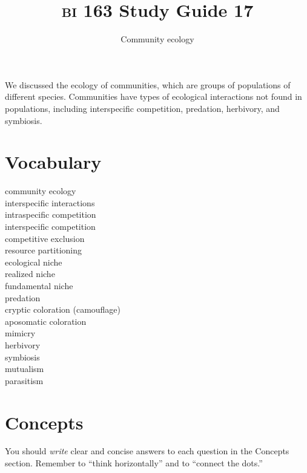 \documentclass[letterpaper]{tufte-handout}
\title{{\scshape bi} 163 Study Guide 17}
\author{Community ecology}
\date{} %
\begin{document}
\maketitle	%

We discussed the ecology of communities, which are groups of populations of different species.  Communities have types of ecological interactions not found in populations, including interspecific competition, predation, herbivory, and symbiosis.

\section*{Vocabulary}

\vspace{-1\baselineskip}
\begin{multicols}{2}
community ecology\\
interspecific interactions\\
intraspecific competition\\
interspecific competition\\
competitive exclusion\\
resource partitioning\\
ecological niche\\
realized niche\\
fundamental niche\\
predation \\
cryptic coloration (camouflage)\\
aposomatic coloration\\
mimicry\\
herbivory \\
symbiosis\\
mutualism\\
parasitism
\end{multicols}

\section*{Concepts}

You should \emph{write} clear and concise answers to each question in the Concepts section.  Remember to ``think horizontally'' and to ``connect the dots.'' 
\end{document}
